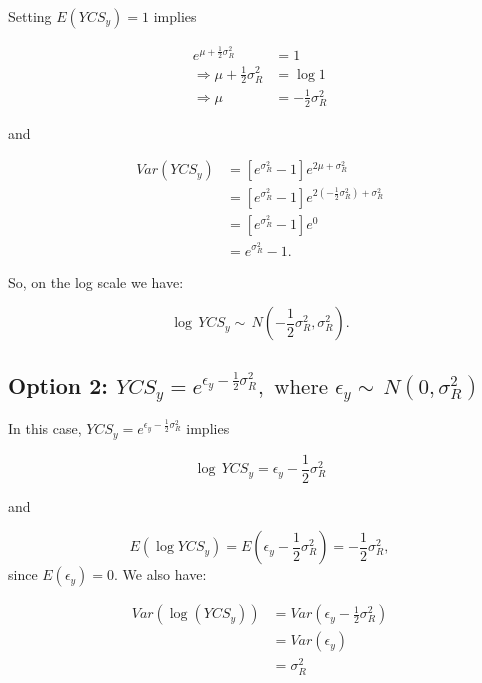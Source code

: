 \begin{appendices}
Setting \(E(YCS_y) = 1\) implies

\begin{align}
e^{\mu + \frac{1}{2}\sigma^2_R} &= 1 \nonumber \\
\Rightarrow  \mu + \frac{1}{2}\sigma^2_R &= \log 1 \nonumber \\
\Rightarrow \mu &= -\frac{1}{2}\sigma^2_R
\label{musolve}
\end{align}

and

\begin{align}
Var(YCS_y) &= \left[e^{\sigma^2_R}-1\right]e^{2\mu + \sigma^2_R} \nonumber \\
&= \left[e^{\sigma^2_R}-1\right]e^{2(-\frac{1}{2}\sigma^2_R) + \sigma^2_R} \nonumber \\
&=\left[e^{\sigma^2_R}-1\right]e^0 \nonumber \\
&= e^{\sigma^2_R}-1.
\end{align}

So, on the log scale we have:

\[\log\, YCS_y \sim \,N\left(-\frac{1}{2}\sigma^2_R, \sigma^2_R\right).\]

\subsection*{\texorpdfstring{Option 2:
		\(YCS_y = e^{\epsilon_y - \frac{1}{2}\sigma^2_R},\,\, \text{where } \epsilon_y \sim \,N(0, \sigma^2_R)\)}{1.2 Option 2: YCS\_y = e\^{}\{\textbackslash{}epsilon\_y - \textbackslash{}frac\{1\}\{2\}\textbackslash{}sigma\^{}2\_R\},\textbackslash{},\textbackslash{}, \textbackslash{}text\{where \} \textbackslash{}epsilon\_y \textbackslash{}sim \textbackslash{},N(0, \textbackslash{}sigma\^{}2\_R)}}\label{option-2-ycs_y-eepsilon_y---frac12sigma2_r-textwhere-epsilon_y-sim-n0-sigma2_r}

In this case, \(YCS_y = e^{\epsilon_y - \frac{1}{2}\sigma^2_R}\) implies

\[\log\, YCS_y = \epsilon_y - \frac{1}{2}\sigma^2_R\]

and

\[E(\log YCS_y) = E\left(\epsilon_y - \frac{1}{2}\sigma^2_R\right) = -\frac{1}{2}\sigma^2_R,\]
since \(E(\epsilon_y) =0\). We also have:

\begin{align}
Var(\log(YCS_y)) &= Var\left(\epsilon_y - \frac{1}{2}\sigma^2_R\right) \nonumber\\
&=Var(\epsilon_y)\nonumber \\
&=\sigma^2_R
\end{align}


\end{appendices}
